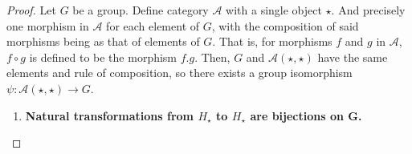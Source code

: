 \documentclass[a4paper]{article}
\theoremstyle{definition}
\begin{document}
		\begin{proof} \setcounter{equation}{0} Let $G$ be a group.
			Define category $\mathcal{A}$ with a single object $\star$. And precisely one morphism
			in $\mathcal{A} $ for each element of $G$, with the composition of said morphisms
			being as that of elements of $G$.
			That is, for morphisms $f$ and $g$ in $\mathcal{A}$, $f \circ g$ is defined to
			be the morphism $f.g$. Then, $G$ and $\mathcal{A}(\star, \star)$ have the
			same elements
			and rule of composition, so there exists a group isomorphism $\psi:
			\mathcal{A} (\star,\star) \to G$.

			\begin{enumerate}[label=\Roman*]
				\item \textbf{Natural transformations from $H_\star$
					to $H_\star$ are bijections on G.}


\end{enumerate}
\end{proof}
\end{document}
